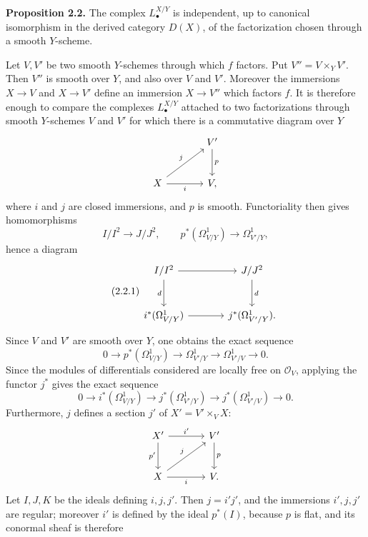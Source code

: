 \textbf{Proposition 2.2.} The complex $L^{X/Y}_\bullet$ is independent, up to canonical isomorphism in the derived category $D(X)$, of the factorization chosen through a smooth $Y$-scheme.

Let $V,V'$ be two smooth $Y$-schemes through which $f$ factors. Put $V''=V\times_Y V'$. Then $V''$ is smooth over $Y$, and also over $V$ and $V'$. Moreover the immersions $X\to V$ and $X\to V'$ define an immersion $X\to V''$ which factors $f$. It is therefore enough to compare the complexes $L^{X/Y}_\bullet$ attached to two factorizations through smooth $Y$-schemes $V$ and $V'$ for which there is a commutative diagram over $Y$
\[
\begin{tikzcd}[column sep=large,row sep=large]
& V' \arrow[d,"p"]\\
X \arrow[ur,"j"] \arrow[r,"i"'] & V,
\end{tikzcd}
\]
where $i$ and $j$ are closed immersions, and $p$ is smooth. Functoriality then gives homomorphisms
\[
I/I^2\longrightarrow J/J^2,
\qquad
p^*(\Omega^1_{V/Y})\longrightarrow\Omega^1_{V'/Y},
\]
hence a diagram
\begin{equation}\tag{2.2.1}
\begin{tikzcd}[column sep=large,row sep=large]
I/I^2 \arrow[r] \arrow[d,"d"'] & J/J^2 \arrow[d,"d"]\\
i^*(\Omega^1_{V/Y}) \arrow[r] & j^*(\Omega^1_{V'/Y}).
\end{tikzcd}
\end{equation}
Since $V$ and $V'$ are smooth over $Y$, one obtains the exact sequence
\[
0\longrightarrow p^*(\Omega^1_{V/Y})\longrightarrow\Omega^1_{V'/Y}
\longrightarrow\Omega^1_{V'/V}\longrightarrow0.
\]
Since the modules of differentials considered are locally free on $\mathcal O_V$, applying the functor $j^*$ gives the exact sequence
\begin{equation}\tag{2.2.2}
0\longrightarrow i^*(\Omega^1_{V/Y})\longrightarrow j^*(\Omega^1_{V'/Y})
\longrightarrow j^*(\Omega^1_{V'/V})\longrightarrow0.
\end{equation}
Furthermore, $j$ defines a section $j'$ of $X'=V'\times_V X$:
\[
\begin{tikzcd}[column sep=large,row sep=large]
X' \arrow[r,"i'"] \arrow[d,"p'"'] & V' \arrow[d,"p"]\\
X \arrow[r,"i"'] \arrow[ur,"j"] & V .
\end{tikzcd}
\]
Let $I,J,K$ be the ideals defining $i,j,j'$. Then $j=i'j'$, and the immersions $i',j,j'$ are regular; moreover $i'$ is defined by the ideal $p^*(I)$, because $p$ is flat, and its conormal sheaf is therefore
